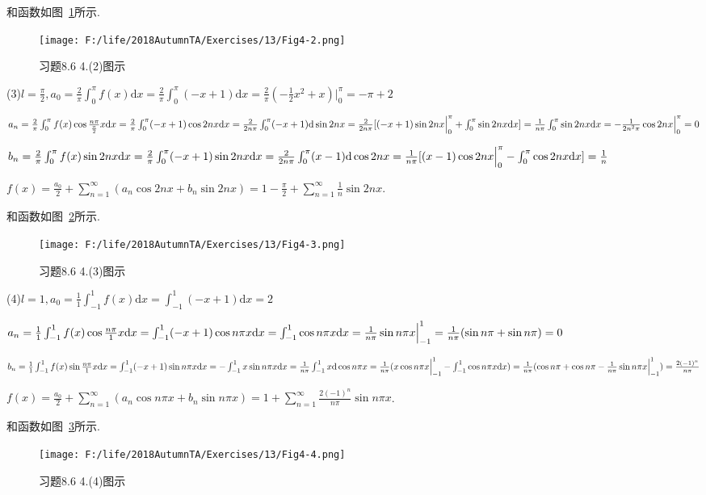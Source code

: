 \documentclass[12pt,UTF8]{ctexart}
\newcommand\Ser[1]{\sum_{n=#1}^\infty}
\begin{document}
\begin{enumerate}
和函数如图~\ref{4-2}所示.
\begin{figure}[H]
\begin{center}
\texttt{[image: F:/life/2018AutumnTA/Exercises/13/Fig4-2.png]}
\end{center}
\caption{习题8.6 4.(2)图示}
\label{4-2}
\end{figure}
(3)$l=\frac\pi2,a_0=\frac2\pi\int_0^\pi f(x)\mathrm dx=\frac2\pi\int_0^\pi(-x+1)\mathrm dx=\frac2\pi(-\frac12x^2+x)\Big|_0^\pi=-\pi+2$

$a_n=\frac2\pi\int_0^\pi f(x)\cos\frac{n\pi}{\frac\pi2}x\mathrm dx=\frac2\pi\int_0^\pi(-x+1)\cos2nx\mathrm dx=\frac2{2n\pi}\int_0^\pi(-x+1)\mathrm d\sin2nx\\
=\frac2{2n\pi}[(-x+1)\sin2nx\Big|_0^\pi+\int_0^\pi\sin2nx\mathrm dx]=\frac1{n\pi}\int_0^\pi\sin2nx\mathrm dx=-\frac1{2n^2\pi}\cos2nx\Big|_0^\pi=0$

$b_n=\frac2\pi\int_0^\pi f(x)\sin2nx\mathrm dx=\frac2\pi\int_0^\pi(-x+1)\sin2nx\mathrm dx=\frac2{2n\pi}\int_0^\pi(x-1)\mathrm d\cos2nx\\
=\frac1{n\pi}[(x-1)\cos2nx\Big|_0^\pi-\int_0^\pi\cos2nx\mathrm dx]=\frac1n$

$f(x)=\frac{a_0}2+\Ser{1}(a_n\cos2nx+b_n\sin2nx)=1-\frac\pi2+\Ser{1}\frac1n\sin2nx$.

和函数如图~\ref{4-3}所示.
\begin{figure}[H]
\begin{center}
\texttt{[image: F:/life/2018AutumnTA/Exercises/13/Fig4-3.png]}
\end{center}
\caption{习题8.6 4.(3)图示}
\label{4-3}
\end{figure}
(4)$l=1,a_0=\frac11\int_{-1}^1f(x)\mathrm dx=\int_{-1}^1(-x+1)\mathrm dx=2$

$a_n=\frac11\int_{-1}^1f(x)\cos\frac{n\pi}1x\mathrm dx=\int_{-1}^1(-x+1)\cos n\pi x\mathrm dx=\int_{-1}^1\cos n\pi x\mathrm dx=\frac1{n\pi}\sin n\pi x\Big|_{-1}^1\\
=\frac1{n\pi}(\sin n\pi+\sin n\pi)=0$

$b_n=\frac11\int_{-1}^1f(x)\sin\frac{n\pi}1x\mathrm dx=\int_{-1}^1(-x+1)\sin n\pi x\mathrm dx=-\int_{-1}^1x\sin n\pi x\mathrm dx=\frac1{n\pi}\int_{-1}^1x\mathrm d\cos n\pi x\\
=\frac1{n\pi}(x\cos n\pi x\Big|_{-1}^1-\int_{-1}^1\cos n\pi x\mathrm dx)=\frac1{n\pi}(\cos n\pi+\cos n\pi-\frac1{n\pi}\sin n\pi x\Big|_{-1}^1)=\frac{2(-1)^n}{n\pi}$

$f(x)=\frac{a_0}2+\Ser{1}(a_n\cos n\pi x+b_n\sin n\pi x)=1+\Ser{1}\frac{2(-1)^n}{n\pi}\sin n\pi x$.

和函数如图~\ref{4-4}所示.
\begin{figure}[H]
\begin{center}
\texttt{[image: F:/life/2018AutumnTA/Exercises/13/Fig4-4.png]}
\end{center}
\caption{习题8.6 4.(4)图示}
\label{4-4}
\end{figure}
\end{enumerate}
\end{document}
